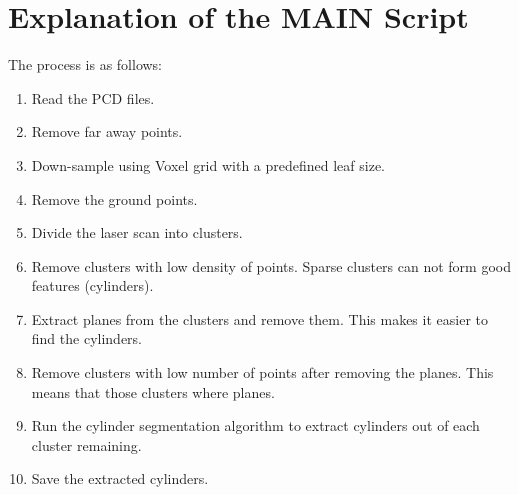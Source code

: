 \documentclass[twoside]{article}
\begin{document}
\section{Explanation of the MAIN Script}
The process is as follows:
\begin{enumerate}
	\item Read the PCD files.
	\item Remove far away points.
	\item Down-sample using Voxel grid with a predefined leaf size.
	\item Remove the ground points.
	\item Divide the laser scan into clusters.
	\item Remove clusters with low density of points. Sparse clusters can not form good features (cylinders).
	\item Extract planes from the clusters and remove them. This makes it easier to find the cylinders.
	\item Remove clusters with low number of points after removing the planes. This means that those clusters where planes.
	\item Run the cylinder segmentation algorithm to extract cylinders out of each cluster remaining.
	\item Save the extracted cylinders.
\end{enumerate}
\end{document}
